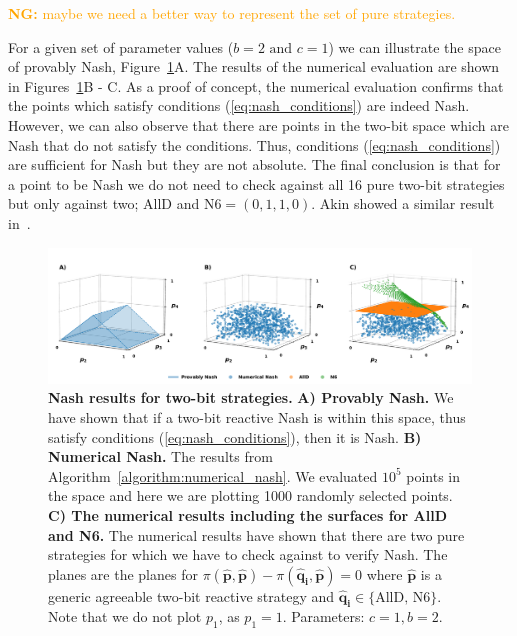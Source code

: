 \documentclass{article}
\theoremstyle{definition}
\newcommand{\nikoleta}[1]{\textcolor{orange}{{\bf NG:} #1}}
\begin{document}
\nikoleta{maybe we need a better way to represent the set of pure strategies.}

For a given set of parameter values (\(b=2 \text{ and } c=1\)) we can illustrate
the space of provably Nash, Figure~\ref{fig:two_bit_reactive_nash_results}A. The
results of the numerical evaluation are shown in
Figures~\ref{fig:two_bit_reactive_nash_results}B - C. As a proof of concept, the
numerical evaluation confirms that the points which satisfy conditions
(\ref{eq:nash_conditions}) are indeed Nash. However, we can also observe
that there are points in the two-bit space which are Nash that do not satisfy
the conditions. Thus, conditions (\ref{eq:nash_conditions}) are sufficient for
Nash but they are not absolute. The final conclusion is that for a point to be Nash
we do not need to check against all 16 pure two-bit strategies but only against
two; AllD and N6\(=(0, 1, 1, 0)\). Akin showed a similar result
in~\citep{akin:EGADS:2016}.


\begin{figure}[!htbp]
     \centering
     \includegraphics[width=\textwidth]{static/two_bit_results.pdf}
     \caption{\textbf{Nash results for two-bit strategies.}
     \textbf{A) Provably Nash.} We have shown that if a two-bit reactive Nash is
     within this space, thus satisfy conditions (\ref{eq:nash_conditions}), then
     it is Nash. \textbf{B) Numerical Nash.} The results from
     Algorithm~\ref{algorithm:numerical_nash}. We evaluated \(10 ^ 5\) points in
     the space and here we are plotting 1000 randomly selected points. \textbf{C)
     The numerical results including the surfaces for AllD and N6.} The
     numerical results have shown that there are two pure strategies for which
     we have to check against to verify Nash. The planes are the planes for
     \(\pi(\mathbf{\hat{p}}, \mathbf{\hat{p}}) - \pi(\mathbf{\hat{q}_i},
     \mathbf{\hat{p}}) = 0\) where \(\mathbf{\hat{p}}\) is a generic agreeable
     two-bit reactive strategy and \(\mathbf{\hat{q}_i} \in \{\text{AllD, N6}\}\).
     Note that we do
     not plot \(p_1\), as \(p_1=1\). Parameters: \(c=1,
     b=2\).}\label{fig:two_bit_reactive_nash_results}
\end{figure}
\end{document}
